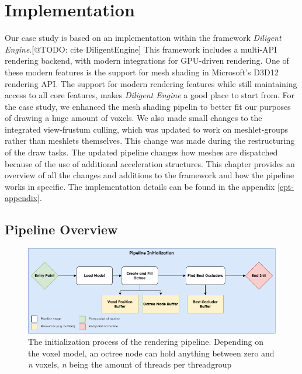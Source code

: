 \chapter{Implementation} \label{cpt-implementation}

Our case study is based on an implementation within the framework \emph{Diligent Engine}.[@TODO: cite DiligentEngine]
This framework includes a multi-\ac{API} rendering backend, with modern integrations for \ac{GPU}-driven rendering.
One of these modern features is the support for mesh shading in Microsoft's D3D12 rendering \ac{API}. 
The support for modern rendering features while still maintaining access to all core features, makes 
\emph{Diligent Engine} a good place to start from. For the case study, we enhanced the mesh shading pipelin 
to better fit our purposes of drawing a huge amount of voxels. We also made small changes to the integrated 
view-frustum culling, which was updated to work on meshlet-groups rather than meshlets themselves. This change 
was made during the restructuring of the draw tasks. The updated pipeline changes how meshes are dispatched 
because of the use of additional acceleration structures. This chapter provides an overview of all the changes and 
additions to the framework and how the pipeline works in specific. The implementation details can be found in the 
appendix \ref{cpt-appendix}.

\section{Pipeline Overview}

\begin{figure}[h]
    \centering
    \includegraphics[width=\linewidth]{images/graphics/pipeline-initialization.png}
    \caption{The initialization process of the rendering pipeline. Depending on the voxel model, an octree node 
    can hold anything between zero and \emph{n} voxels, \emph{n} being the amount of threads per threadgroup}
    \label{fig:pipeline-initialization}
\end{figure}


